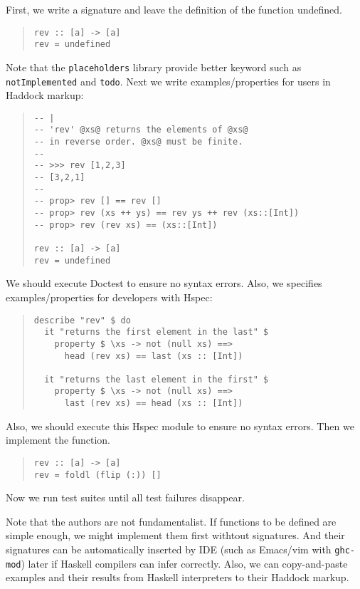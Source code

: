 \documentclass[preprint]{sigplanconf}
\newcommand{\hspec}{Hspec}
\newcommand{\doctest}{Doctest}
\begin{document}
First, we write a signature and leave the definition of the function undefined.

\begin{quote}
\small
\begin{verbatim}
rev :: [a] -> [a]
rev = undefined
\end{verbatim}
\end{quote}

\noindent Note that the {\tt placeholders} library provide better keyword such as {\tt notImplemented} and {\tt todo}.
Next we write examples/properties for users in Haddock markup:

\begin{quote}
\small
\begin{verbatim}
-- |
-- 'rev' @xs@ returns the elements of @xs@
-- in reverse order. @xs@ must be finite.
--
-- >>> rev [1,2,3]
-- [3,2,1]
--
-- prop> rev [] == rev []
-- prop> rev (xs ++ ys) == rev ys ++ rev (xs::[Int])
-- prop> rev (rev xs) == (xs::[Int])

rev :: [a] -> [a]
rev = undefined
\end{verbatim}
\end{quote}

\noindent We should execute \doctest{} to ensure no syntax errors.
Also, we specifies examples/properties for developers with \hspec{}:

\begin{quote}
\small
\begin{verbatim}
describe "rev" $ do
  it "returns the first element in the last" $
    property $ \xs -> not (null xs) ==>
      head (rev xs) == last (xs :: [Int])

  it "returns the last element in the first" $
    property $ \xs -> not (null xs) ==>
      last (rev xs) == head (xs :: [Int])
\end{verbatim}
\end{quote}

\noindent Also, we should execute this \hspec{} module
to ensure no syntax errors.
Then we implement the function.

\begin{quote}
\small
\begin{verbatim}
rev :: [a] -> [a]
rev = foldl (flip (:)) []
\end{verbatim}
\end{quote}

\noindent Now we run test suites until
all test failures disappear.

Note that the authors are not fundamentalist.
If functions to be defined are simple enough,
we might implement them first withtout signatures.
And their signatures can be automatically
inserted by IDE (such as Emacs/vim with {\tt ghc-mod}) later
if Haskell compilers can infer correctly.
Also, we can copy-and-paste examples and their results
from Haskell interpreters to their Haddock markup.
\end{document}
